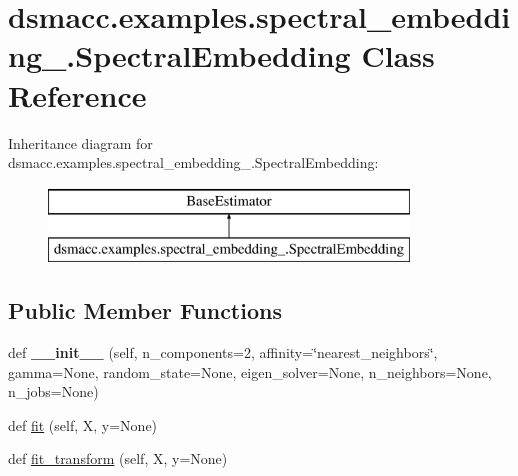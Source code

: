 \hypertarget{classdsmacc_1_1examples_1_1spectral__embedding___1_1SpectralEmbedding}{}\section{dsmacc.\+examples.\+spectral\+\_\+embedding\+\_\+.\+Spectral\+Embedding Class Reference}
\label{classdsmacc_1_1examples_1_1spectral__embedding___1_1SpectralEmbedding}
Inheritance diagram for dsmacc.\+examples.\+spectral\+\_\+embedding\+\_\+.\+Spectral\+Embedding\+:\begin{figure}[H]
\begin{center}
\leavevmode
\includegraphics[height=2.000000cm]{classdsmacc_1_1examples_1_1spectral__embedding___1_1SpectralEmbedding}
\end{center}
\end{figure}
\subsection*{Public Member Functions}
\begin{DoxyCompactItemize}
\item 
\mbox{\label{classdsmacc_1_1examples_1_1spectral__embedding___1_1SpectralEmbedding_aaea69a628e852d537b80948e9705ba52}} 
def {\bfseries \+\_\+\+\_\+init\+\_\+\+\_\+} (self, n\+\_\+components=2, affinity=\char`\"{}nearest\+\_\+neighbors\char`\"{}, gamma=None, random\+\_\+state=None, eigen\+\_\+solver=None, n\+\_\+neighbors=None, n\+\_\+jobs=None)
\item 
def \mbox{\hyperlink{classdsmacc_1_1examples_1_1spectral__embedding___1_1SpectralEmbedding_a0f599bc627028d8587bafb0f89f76e0b}{fit}} (self, X, y=None)
\item 
def \mbox{\hyperlink{classdsmacc_1_1examples_1_1spectral__embedding___1_1SpectralEmbedding_ae55f8c9eaf776722b244ae48d6415ab7}{fit\+\_\+transform}} (self, X, y=None)
\end{DoxyCompactItemize}

